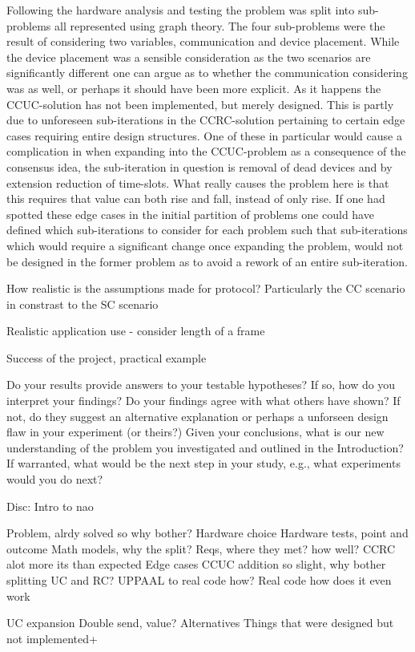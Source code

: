 \bigskip \noindent
Following the hardware analysis and testing the problem was split into sub-problems all represented using graph theory.
The four sub-problems were the result of considering two variables, communication and device placement.
While the device placement was a sensible consideration as the two scenarios are significantly different one can argue as to whether the communication considering was as well, or perhaps it should have been more explicit.
As it happens the CCUC-solution has not been implemented, but merely designed.
This is partly due to unforeseen sub-iterations in the CCRC-solution pertaining to certain edge cases requiring entire design structures.
One of these in particular would cause a complication in when expanding into the CCUC-problem as a consequence of the consensus idea, the sub-iteration in question is removal of dead devices and by extension reduction of time-slots.
What really causes the problem here is that this requires that value can both rise and fall, instead of only rise.
If one had spotted these edge cases in the initial partition of problems one could have defined which sub-iterations to consider for each problem such that sub-iterations which would require a significant change once expanding the problem, would not be designed in the former problem as to avoid a rework of an entire sub-iteration.



How realistic is the assumptions made for protocol? Particularly the CC scenario in constrast to the SC scenario

Realistic application use - consider length of a frame

Success of the project, practical example


Do your results provide answers to your testable hypotheses? If so, how do you interpret your findings?
Do your findings agree with what others have shown? If not, do they suggest an alternative explanation or perhaps a unforseen design flaw in your experiment (or theirs?)
Given your conclusions, what is our new understanding of the problem you investigated and outlined in the Introduction?
If warranted, what would be the next step in your study, e.g., what experiments would you do next?

Disc: Intro to nao

Problem, alrdy solved so why bother?
Hardware choice
Hardware tests, point and outcome
Math models, why the split?
Reqs, where they met? how well?
CCRC alot more its than expected
Edge cases
CCUC addition so slight, why bother splitting UC and RC?
UPPAAL to real code how?
Real code how does it even work

UC expansion
Double send, value?
Alternatives
Things that were designed but not implemented+

